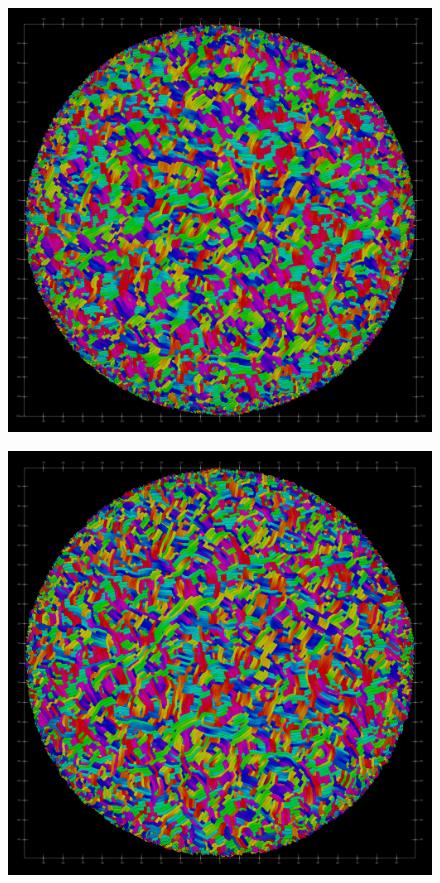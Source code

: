 \documentclass[conference]{IEEEtran}
\begin{document}
\begin{figure}[h]
    \centering
    \includegraphics[width=\linewidth]{figures/orientation_comparisons/soft_e-3_orient.jpeg}
    \caption{ }
\end{figure}
\begin{figure}[h]
    \centering
    \includegraphics[width=\linewidth]{figures/orientation_comparisons/soft_e-4_orient.jpeg}
    \caption{ }
\end{figure}
\end{document}
